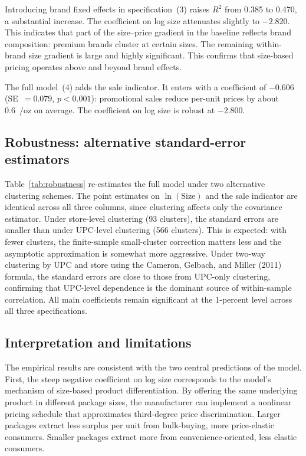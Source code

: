 \documentclass[12pt]{article}
\theoremstyle{definition}
\begin{document}
Introducing brand fixed effects in specification~(3) raises $R^2$ from 0.385 to 0.470, a substantial increase.
The coefficient on log size attenuates slightly to $-2.820$. This indicates that part of the size--price gradient in the baseline reflects brand composition: premium brands cluster at certain sizes.
The remaining within-brand size gradient is large and highly significant. This confirms that size-based pricing operates above and beyond brand effects.

The full model~(4) adds the sale indicator. It enters with a coefficient of $-0.606$ (SE~$= 0.079$, $p < 0.001$): promotional sales reduce per-unit prices by about 0.6~\textcent/oz on average.
The coefficient on log size is robust at $-2.800$.



\subsection{Robustness: alternative standard-error estimators}

Table~\ref{tab:robustness} re-estimates the full model under two alternative clustering schemes. The point estimates on $\ln(\text{Size})$ and the sale indicator are identical across all three columns, since clustering affects only the covariance estimator. Under store-level clustering (93 clusters), the standard errors are smaller than under UPC-level clustering (566 clusters). This is expected: with fewer clusters, the finite-sample small-cluster correction matters less and the asymptotic approximation is somewhat more aggressive. Under two-way clustering by UPC and store using the Cameron, Gelbach, and Miller (2011) formula, the standard errors are close to those from UPC-only clustering, confirming that UPC-level dependence is the dominant source of within-sample correlation. All main coefficients remain significant at the 1-percent level across all three specifications.



\subsection{Interpretation and limitations}

The empirical results are consistent with the two central predictions of the model.
First, the steep negative coefficient on log size corresponds to the model's mechanism of size-based product differentiation. By offering the same underlying product in different package sizes, the manufacturer can implement a nonlinear pricing schedule that approximates third-degree price discrimination.
Larger packages extract less surplus per unit from bulk-buying, more price-elastic consumers. Smaller packages extract more from convenience-oriented, less elastic consumers.
\end{document}
